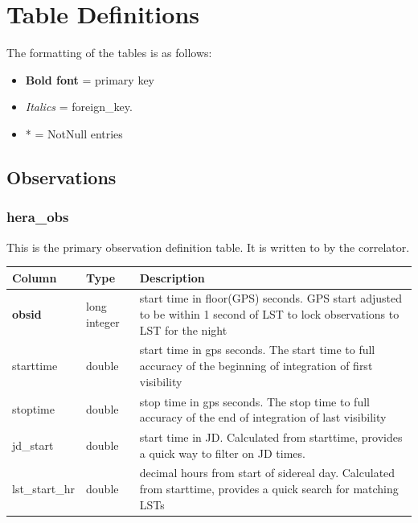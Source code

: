 \documentclass{article}
\begin{document}
{%
\newpage

\section{Table Definitions}
\label{sec:tables}

\vspace{5mm}
\etocsettocstyle{}{}
\localtableofcontents
\newpage

The formatting of the tables is as follows:
\begin{itemize}\setlength\itemsep{-.3em}
	\item {\bf Bold font} = primary key
	\item {\em Italics} = foreign\_key.
	\item * = NotNull entries
\end{itemize}


\subsection{Observations}
\subsubsection{hera\_obs}
This is the primary observation definition table. It is written to by the correlator.

\begin{center}
 \begin{tabular}{| p{4cm} | p{2cm} | p{10cm} |}
 \hline
 {\bf Column} & {\bf Type}  & {\bf Description} \\ [0.5ex]  \hline\hline
 \textbf{obsid} & long integer & start time in floor(GPS) seconds. GPS start adjusted to be within 1 second of LST to lock observations to LST for the night \\ \hline
 starttime & double & start time in gps seconds. The start time to full accuracy of the beginning of integration of first visibility \\\hline
 stoptime & double & stop time in gps seconds. The stop time to full accuracy of the end of integration of last visibility \\\hline
 jd\_start & double & start time in JD. Calculated from starttime, provides a quick way to filter on JD times. \\\hline
 lst\_start\_hr & double & decimal hours from start of sidereal day. Calculated from starttime, provides a quick search for matching LSTs \\\hline
 \end{tabular}
\end{center}

}
\end{document}
